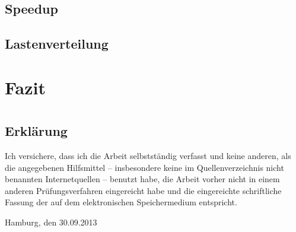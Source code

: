 \documentclass[
	12pt,
	a4paper,
	BCOR10mm,
	DIV14,
	listof=totoc,
	bibliography=totoc,
	headsepline
]{scrreprt}
\begin{document}
\section{Speedup}

\section{Lastenverteilung}


\chapter{Fazit}
\label{Fazit}


\newpage

\thispagestyle{empty}

\chapter*{}

\section*{Erklärung}

Ich versichere, dass ich die Arbeit selbstständig verfasst und keine anderen, als die angegebenen Hilfsmittel -- insbesondere keine im Quellenverzeichnis nicht benannten Internetquellen -- benutzt habe, die Arbeit vorher nicht in einem anderen Prüfungsverfahren eingereicht habe und die eingereichte schriftliche Fassung der auf dem elektronischen Speichermedium entspricht.

\smallskip

\bigskip
\bigskip
\bigskip

Hamburg, den 30.09.2013  \quad \dotfill
\end{document}
